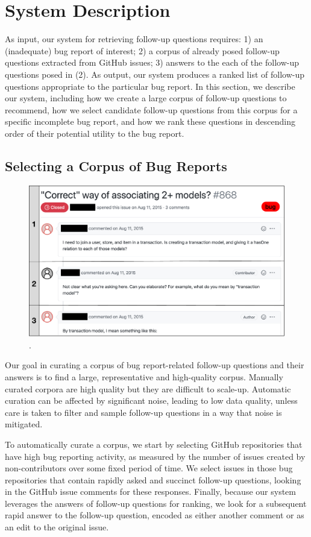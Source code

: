\section{System Description}

As input, our system for retrieving follow-up questions requires: 1) an (inadequate) bug
report of interest; 2) a corpus of already posed follow-up questions extracted
from GitHub issues; 3) answers to the each of the follow-up questions posed in (2). As output, our system
produces a ranked list of follow-up questions appropriate to the particular bug report.
In this section, we describe our system, including how we create a large corpus of follow-up questions
to recommend, how we select candidate follow-up questions from this corpus for a specific incomplete
bug report, and how we rank these questions in descending order of their potential utility to the bug report.

\subsection{Selecting a Corpus of Bug Reports}


\begin{figure}[ht]
\centering
\includegraphics[width=0.70\linewidth]{figures/sample_issue.pdf}
\caption{.}
\label{fig:sample_br}
\end{figure}

Our goal in curating a corpus of bug report-related follow-up questions and their answers
is to find a large, representative and high-quality corpus. Manually curated corpora are
high quality but they are difficult to scale-up. Automatic curation can be affected by
significant noise, leading to low data quality, unless care is taken
to filter and sample follow-up questions in a way that noise is mitigated.

To automatically curate a corpus, we start by selecting GitHub repositories that have high bug reporting activity,
as measured by the number of issues created by non-contributors over some fixed period of time.
We select issues in those bug repositories that contain rapidly asked and succinct follow-up
questions, looking in the GitHub issue comments for these responses. Finally, because our system leverages
the answers of follow-up questions for ranking, we look for
a subsequent rapid answer to the follow-up question, encoded as either another comment or as an edit to the
original issue.

